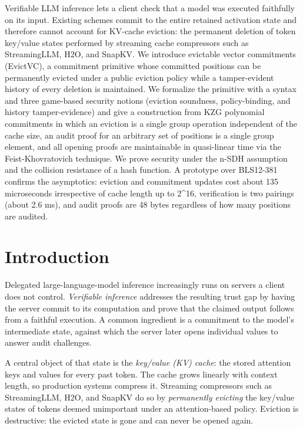 \documentclass[version=preprint]{iacrcc}
\theoremstyle{definition}
\begin{document}
\begin{textabstract}
Verifiable LLM inference lets a client check that a model was executed faithfully on its input. Existing schemes commit to the entire retained activation state and therefore cannot account for KV-cache eviction: the permanent deletion of token key/value states performed by streaming cache compressors such as StreamingLLM, H2O, and SnapKV. We introduce evictable vector commitments (EvictVC), a commitment primitive whose committed positions can be permanently evicted under a public eviction policy while a tamper-evident history of every deletion is maintained. We formalize the primitive with a syntax and three game-based security notions (eviction soundness, policy-binding, and history tamper-evidence) and give a construction from KZG polynomial commitments in which an eviction is a single group operation independent of the cache size, an audit proof for an arbitrary set of positions is a single group element, and all opening proofs are maintainable in quasi-linear time via the Feist-Khovratovich technique. We prove security under the n-SDH assumption and the collision resistance of a hash function. A prototype over BLS12-381 confirms the asymptotics: eviction and commitment updates cost about 135 microseconds irrespective of cache length up to 2^16, verification is two pairings (about 2.6 ms), and audit proofs are 48 bytes regardless of how many positions are audited.
\end{textabstract}

\section{Introduction}\label{sec:intro}

Delegated large-language-model inference increasingly runs on servers a client
does not control. \emph{Verifiable inference} addresses the resulting trust gap
by having the server commit to its computation and prove that the claimed output
follows from a faithful execution. A common ingredient is a commitment to the
model's intermediate state, against which the server later opens individual
values to answer audit challenges.

A central object of that state is the \emph{key/value (KV) cache}: the stored
attention keys and values for every past token. The cache grows linearly with
context length, so production systems compress it. Streaming compressors such as
StreamingLLM, H2O, and SnapKV do so by \emph{permanently evicting} the
key/value states of tokens deemed unimportant under an attention-based policy.
Eviction is destructive: the evicted state is gone and can never be opened
again.
\end{document}
